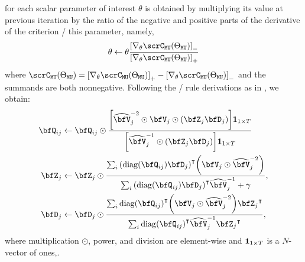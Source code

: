  for each scalar parameter of interest $\theta$ is obtained by multiplying its value at previous iteration by the ratio of the negative and positive parts of the derivative of the criterion \wrt/ this parameter, namely,
\begin{equation*}
    \theta \gets \theta \frac{\kbracket{\knabla_\theta \scrC_{\mathtt{MU}}(\Theta_{\mathtt{MU}})}_{-}}
                             {\kbracket{\knabla_\theta \scrC_{\mathtt{MU}}(\Theta_{\mathtt{MU}})}_{+}}
\end{equation*}
where $\scrC_{\mathtt{MU}}(\Theta_{\mathtt{MU}}) = {\kbracket{\knabla_\theta \scrC_{\mathtt{MU}}(\Theta_{\mathtt{MU}})}_{+}} - {\kbracket{\knabla_\theta \scrC_{\mathtt{MU}}(\Theta_{\mathtt{MU}})}_{-}}$ and the summands are both nonnegative.
Following the \MU/ rule derivations as in \citeauthor{ozerov2010multichannel}, we obtain:
\begin{align}
    \vQ_{\idxMicSrc} &\gets\vQ_{\idxMicSrc} \odot \frac{\kbracket{\wh{\mV}_\idxSrc^{-2} \odot \mV_\idxSrc \odot \kparen{\mZ_\idxSrc \mD_\idxSrc}}\onesVect_{1\times T}}{
                                            \kbracket{\wh{\mV}_\idxSrc^{-1} \odot \kparen{\mZ_\idxSrc \mD_\idxSrc}}\onesVect_{1\times T}}\\
    \mZ_\idxSrc &\gets \mZ_\idxSrc \odot \frac{\sum_\idxMic \ktranspose{(\diag(\vQ_{\idxMicSrc}) \mD_\idxSrc)} \kparen{\mV_\idxSrc \odot \wh{\mV}_\idxSrc^{-2}}}{
                                            \sum_\idxMic \ktranspose{(\diag(\vQ_{\idxMicSrc}) \mD_\idxSrc)} \wh{\mV}_\idxSrc^{-1} + \gamma},\\
    \mD_\idxSrc &\gets \mD_\idxSrc \odot \frac{\sum_\idxMic \ktranspose{ \diag(\vQ_{\idxMicSrc})} \kparen{\mV_\idxSrc \odot \wh{\mV}_\idxSrc^{-2}}\ktranspose{\mZ_\idxSrc}}{
                                            \sum_\idxMic \ktranspose{ \diag(\vQ_{\idxMicSrc})} \wh{\mV}_\idxSrc^{-1} \ktranspose{\mZ_\idxSrc}},
\end{align}
where multiplication $\odot$, power, and division are element-wise and $\mathbf{1}_{1\times T}$ is a $N$-vector of ones,.

